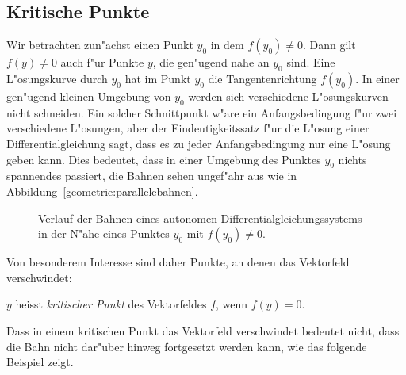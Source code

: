\subsection{Kritische Punkte}
Wir betrachten zun"achst einen Punkt $y_0$ in dem $f(y_0)\ne 0$.
Dann gilt $f(y)\ne 0$ auch f"ur Punkte $y$, die gen"ugend nahe an 
$y_0$ sind.
Eine L"osungskurve durch $y_0$ hat im Punkt $y_0$ die Tangentenrichtung
$f(y_0)$.
In einer gen"ugend kleinen Umgebung von $y_0$ werden sich verschiedene
L"osungskurven nicht schneiden.
Ein solcher Schnittpunkt w"are ein Anfangsbedingung f"ur zwei
verschiedene L"osungen, aber der Eindeutigkeitssatz f"ur die
L"osung einer Differentialgleichung sagt, dass es zu jeder 
Anfangsbedingung nur eine L"osung geben kann.
Dies bedeutet, dass in einer Umgebung des Punktes $y_0$ nichts
spannendes passiert, die Bahnen sehen ungef"ahr aus wie in Abbildung~\ref{geometrie:parallelebahnen}.
\begin{figure}
\centering
\caption{Verlauf der Bahnen eines autonomen Differentialgleichungssystems
in der N"ahe eines Punktes $y_0$ mit $f(y_0)\ne 0$.
\label{geometrie:parallebahnen}}
\end{figure}

Von besonderem Interesse sind daher Punkte, an denen das Vektorfeld
verschwindet:

\begin{definition}
$y$ heisst {\em kritischer Punkt} des Vektorfeldes $f$, wenn $f(y)=0$.
\end{definition}

Dass in einem kritischen Punkt das Vektorfeld verschwindet bedeutet nicht,
dass die Bahn nicht dar"uber hinweg fortgesetzt werden kann,
wie das folgende Beispiel zeigt.

